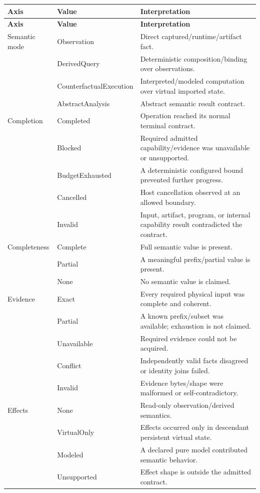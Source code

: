 \documentclass[11pt,oneside,openany]{book}
\begin{document}
\begin{longtable}{L{31mm}L{48mm}L{66mm}}
\toprule
\textbf{Axis} & \textbf{Value} & \textbf{Interpretation} \\
\midrule
\endfirsthead
\toprule
\textbf{Axis} & \textbf{Value} & \textbf{Interpretation} \\
\midrule
\endhead
Semantic mode & Observation & Direct captured/runtime/artifact fact. \\
 & DerivedQuery & Deterministic composition/binding over observations. \\
 & CounterfactualExecution & Interpreted/modeled computation over virtual imported state. \\
 & AbstractAnalysis & Abstract semantic result contract. \\
\midrule
Completion & Completed & Operation reached its normal terminal contract. \\
 & Blocked & Required admitted capability/evidence was unavailable or unsupported. \\
 & BudgetExhausted & A deterministic configured bound prevented further progress. \\
 & Cancelled & Host cancellation observed at an allowed boundary. \\
 & Invalid & Input, artifact, program, or internal capability result contradicted the contract. \\
\midrule
Completeness & Complete & Full semantic value is present. \\
 & Partial & A meaningful prefix/partial value is present. \\
 & None & No semantic value is claimed. \\
\midrule
Evidence & Exact & Every required physical input was complete and coherent. \\
 & Partial & A known prefix/subset was available; exhaustion is not claimed. \\
 & Unavailable & Required evidence could not be acquired. \\
 & Conflict & Independently valid facts disagreed or identity joins failed. \\
 & Invalid & Evidence bytes/shape were malformed or self-contradictory. \\
\midrule
Effects & None & Read-only observation/derived semantics. \\
 & VirtualOnly & Effects occurred only in descendant persistent virtual state. \\
 & Modeled & A declared pure model contributed semantic behavior. \\
 & Unsupported & Effect shape is outside the admitted contract. \\
\bottomrule
\end{longtable}
\end{document}
